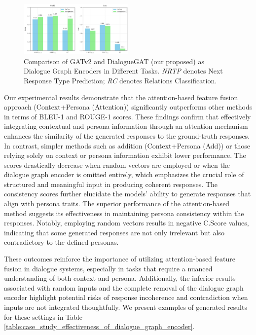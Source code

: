 \documentclass[letterpaper]{article} %
\begin{document}
\begin{figure}[ht]
    \centering
    \includegraphics[width=0.5\textwidth]{./images/compare_gatv2_dialoguegat.png}
    \caption{Comparison of GATv2 and DialogueGAT (our proposed) as Dialogue Graph Encoders in Different Tasks. \textit{NRTP} denotes Next Response Type Prediction; \textit{RC} denotes Relations Classification.}
    \label{fig:compare_gatv2_dialoguegat}
\end{figure}

Our experimental results demonstrate that the attention-based feature fusion approach (Context+Persona (Attention)) significantly outperforms other methods in terms of BLEU-1 and ROUGE-1 scores. These findings confirm that effectively integrating contextual and persona information through an attention mechanism enhances the similarity of the generated responses to the ground-truth responses. In contrast, simpler methods such as addition (Context+Persona (Add)) or those relying solely on context or persona information exhibit lower performance. The scores drastically decrease when random vectors are employed or when the dialogue graph encoder is omitted entirely, which emphasizes the crucial role of structured and meaningful input in producing coherent responses. The consistency scores further elucidate the models' ability to generate responses that align with persona traits. The superior performance of the attention-based method suggests its effectiveness in maintaining persona consistency within the responses. Notably, employing random vectors results in negative C.Score values, indicating that some generated responses are not only irrelevant but also contradictory to the defined personas.

These outcomes reinforce the importance of utilizing attention-based feature fusion in dialogue systems, especially in tasks that require a nuanced understanding of both context and persona. Additionally, the inferior results associated with random inputs and the complete removal of the dialogue graph encoder highlight potential risks of response incoherence and contradiction when inputs are not integrated thoughtfully. We present examples of generated results for these settings in Table \ref{table:case_study_effectiveness_of_dialogue_graph_encoder}.
\end{document}
